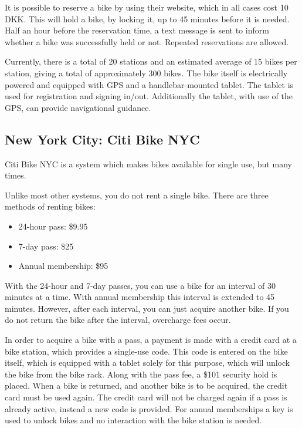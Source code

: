 It is possible to reserve a bike by using their website, which in all cases cost 10 DKK.
This will hold a bike, by locking it, up to 45 minutes before it is needed.
Half an hour before the reservation time, a text message is sent to inform whether a bike was successfully held or not.
Repeated reservations are allowed.

Currently, there is a total of 20 stations and an estimated average of 15 bikes per station, giving a total of approximately 300 bikes.
The bike itself is electrically powered and equipped with GPS and a handlebar-mounted tablet.
The tablet is used for registration and signing in/out.
Additionally the tablet, with use of the GPS, can provide navigational guidance.

\subsection{New York City: Citi Bike NYC}
Citi Bike NYC\cite{nyc_citibike} is a system which makes bikes available for single use, but many times.

Unlike most other systems, you do not rent a single bike.
There are three methods of renting bikes:

\begin{itemize}
\item 24-hour pass: \$9.95
\item 7-day pass: \$25
\item Annual membership: \$95
\end{itemize}

With the 24-hour and 7-day passes, you can use a bike for an interval of 30 minutes at a time.
With annual membership this interval is extended to 45 minutes.
However, after each interval, you can just acquire another bike.
If you do not return the bike after the interval, overcharge fees occur.

In order to acquire a bike with a pass, a payment is made with a credit card at a bike station, which provides a single-use code.
This code is entered on the bike itself, which is equipped with a tablet solely for this purpose, which will unlock the bike from the bike rack.
Along with the pass fee, a \$101 security hold is placed.
When a bike is returned, and another bike is to be acquired, the credit card must be used again.
The credit card will not be charged again if a pass is already active, instead a new code is provided.
For annual memberships a key is used to unlock bikes and no interaction with the bike station is needed.

